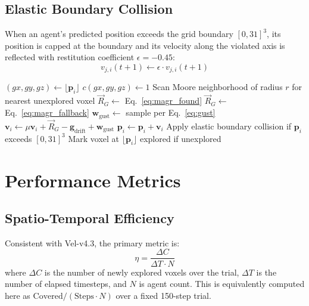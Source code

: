 \documentclass[10pt,journal]{IEEEtran}
\begin{document}
\subsection{Elastic Boundary Collision}
When an agent's predicted position exceeds the grid boundary $[0,31]^3$,
its position is capped at the boundary and its velocity along the violated
axis is reflected with restitution coefficient $\epsilon=-0.45$:
\begin{equation}
v_{j,i}(t+1) \leftarrow \epsilon \cdot v_{j,i}(t+1)
\end{equation}

\begin{algorithm}[t]
\caption{Vel-v5.5 Per-Agent Update}
\label{alg:vel55}
\begin{algorithmic}[1]
    \State $(gx,gy,gz) \gets \lfloor \mathbf{p}_i \rfloor$
    \State $c(gx,gy,gz) \gets 1$
    \State Scan Moore neighborhood of radius $r$ for nearest unexplored voxel
        \State $\vec{R}_G \gets$ Eq.~\ref{eq:magr_found}
    \Else
        \State $\vec{R}_G \gets$ Eq.~\ref{eq:magr_fallback}
    \EndIf
    \State $\mathbf{w}_{\text{gust}} \gets$ sample per Eq.~\ref{eq:gust}
    \State $\mathbf{v}_i \gets \mu\mathbf{v}_i + \vec{R}_G - \mathbf{g}_{\text{drift}} + \mathbf{w}_{\text{gust}}$
    \State $\mathbf{p}_i \gets \mathbf{p}_i + \mathbf{v}_i$
    \State Apply elastic boundary collision if $\mathbf{p}_i$ exceeds $[0,31]^3$
    \State Mark voxel at $\lfloor \mathbf{p}_i \rfloor$ explored if unexplored
\EndProcedure
\end{algorithmic}
\end{algorithm}

\section{Performance Metrics}
\label{sec:metrics}

\subsection{Spatio-Temporal Efficiency}
Consistent with Vel-v4.3, the primary metric is:
\begin{equation}
\eta = \frac{\Delta C}{\Delta T \cdot N}
\end{equation}
where $\Delta C$ is the number of newly explored voxels over the trial,
$\Delta T$ is the number of elapsed timesteps, and $N$ is agent count. This
is equivalently computed here as $\text{Covered}/(\text{Steps}\cdot N)$ over
a fixed 150-step trial.
\end{document}

